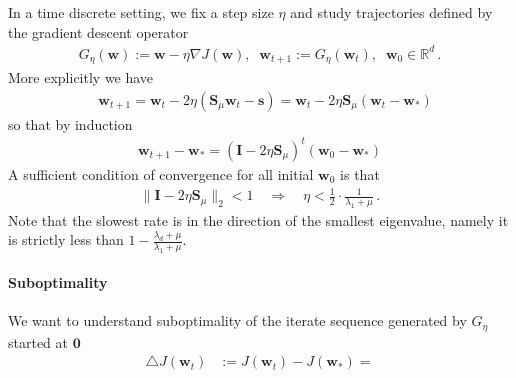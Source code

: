 \documentclass{article}
\newcommand{\w}{{\mathbf w}}
\newcommand{\I}{{\mathbf I}}
\renewcommand{\Re}{{\mathbb R}}
\newcommand{\mS}{{\mathbf S}}
\newcommand{\s}{{\mathbf s}}
\begin{document}
In a time discrete setting, we fix a step size $\eta$ and study trajectories defined by the gradient descent operator 
\begin{align}
G_\eta(\w) := \w - \eta \nabla J(\w),  \;\; \w_{t+1} := G_\eta(\w_t), \;\; \w_0 \in \Re^d \,.
\end{align}
More explicitly we have
\begin{align}
&  \w_{t+1}  = \w_t - 2 \eta \left( \mS_\mu \w_t  - \s \right) =  \w_t - 2 \eta \mS_\mu \left(  \w_t  - \w_* \right)
\end{align}
so that by induction 
\begin{align}
\w_{t+1} - \w_* = \left(\I-2 \eta \mS_\mu \right)^t (\w_0 - \w_*)
\end{align}
A sufficient condition of  convergence for all initial $\w_0$ is that
\begin{align}
\| \I - 2\eta \mS_\mu\|_2 <1 \quad \Longrightarrow \quad 
\eta < \frac{1}{2} \cdot \frac{1}{ \lambda_{1} + \mu} \,.
\end{align}
%
Note that the slowest rate is in the direction of the smallest eigenvalue, namely it is strictly less than $1-\frac{\lambda_d+\mu}{\lambda_1 + \mu}$.
 
\paragraph{Suboptimality} 

We want to understand suboptimality of the iterate sequence generated by $G_\eta$ started at $\bm 0$
\begin{align}
\triangle J(\w_t) & := J(\w_t) - J(\w_*) = 
\end{align}
\end{document}

